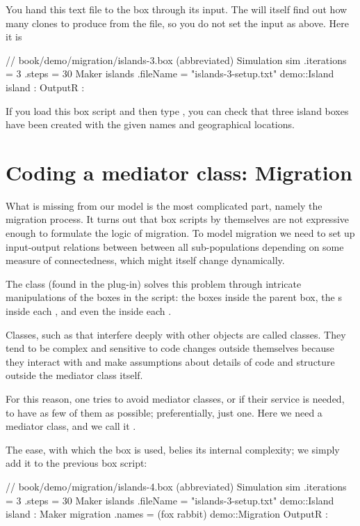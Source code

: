 You hand this text file to the  box through its  input. The  will itself find out how many clones to produce from the file, so you do not set the  input as above. Here it is
\lstset{numbers=left}
\begin{boxscript}
// book/demo/migration/islands-3.box (abbreviated)
Simulation sim {
	.iterations = 3
	.steps = 30
	Maker islands {
		.fileName = "islands-3-setup.txt"
		demo::Island island {
		:
		}
	}
	OutputR {
	:
	}
}
\end{boxscript}
\lstset{numbers=none}

If you load this box script and then type , you can check that three island boxes have been created with the given names and geographical locations.

\section{Coding a mediator class: Migration}
What is missing from our model is the most complicated part, namely the migration process. It turns out that box scripts by themselves are not expressive enough to formulate the logic of migration. To model migration we need to set up  input-output relations between between all sub-populations depending on some measure of connectedness, which might itself change dynamically.

The  class (found in the  plug-in) solves this problem through intricate manipulations of the boxes in the script: the  boxes inside the  parent box, the s inside each , and even the  inside each . 

Classes, such as  that interfere deeply with other objects are called  classes. They tend to be complex and sensitive to code changes outside themselves because they interact with and make assumptions about details of code and structure outside the mediator class itself.

For this reason, one tries to avoid mediator classes, or if their service is needed, to have as few of them as possible; preferentially, just one. Here we need a mediator class, and we call it .

The ease, with which the  box is used, belies its internal complexity; we simply add it to the previous box script:
\lstset{numbers=left}
\begin{boxscript}
// book/demo/migration/islands-4.box (abbreviated)
Simulation sim {
	.iterations = 3
	.steps = 30
	Maker islands {
		.fileName = "islands-3-setup.txt"
		demo::Island island {
		:
		}
	}
	Maker migration {
		.names = (fox rabbit)
		demo::Migration  {
		}
	}
	OutputR {
	:
	}
}
\end{boxscript}
\lstset{numbers=none}

